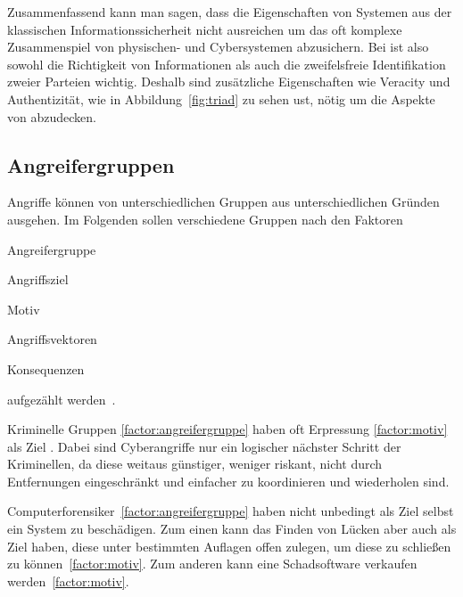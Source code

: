 Zusammenfassend kann man sagen, dass die Eigenschaften von Systemen aus der klassischen Informationssicherheit nicht ausreichen um das oft komplexe Zusammenspiel von physischen- und Cybersystemen abzusichern.
Bei \cps ist also sowohl die Richtigkeit von Informationen als auch die zweifelsfreie Identifikation zweier Parteien wichtig.
Deshalb sind zusätzliche Eigenschaften wie Veracity und Authentizität, wie in Abbildung~\ref{fig:triad} zu sehen ust, nötig um die Aspekte von \cps abzudecken.


\subsection{Angreifergruppen}\label{subsec:angreifergruppen}

Angriffe können von unterschiedlichen Gruppen aus unterschiedlichen Gründen ausgehen.
Im Folgenden sollen verschiedene Gruppen nach den Faktoren
\begin{enumerate*}[label=(\alph*),before=\unskip{: }, itemjoin={{; }}, itemjoin*={{, und }}]
    \item Angreifergruppe\label{factor:angreifergruppe}
    \item Angriffsziel\label{factor:target}
    \item Motiv\label{factor:motiv}
    \item Angriffsvektoren\label{factor:methode}
    \item Konsequenzen\label{factor:konsequenz}
\end{enumerate*} aufgezählt werden~\cite{HLL+17}.

Kriminelle Gruppen \ref{factor:angreifergruppe} haben oft Erpressung \ref{factor:motiv} als Ziel \cite{WYX+10}.
Dabei sind Cyberangriffe nur ein logischer nächster Schritt der Kriminellen, da diese weitaus günstiger, weniger riskant, nicht durch Entfernungen eingeschränkt und einfacher zu koordinieren und wiederholen sind. \cite{CAS+09}

Computerforensiker~\ref{factor:angreifergruppe} haben nicht unbedingt als Ziel selbst ein System zu beschädigen.
Zum einen kann das Finden von Lücken aber auch als Ziel haben, diese unter bestimmten Auflagen offen zulegen, um diese zu schließen zu können~\ref{factor:motiv}. 
Zum anderen kann eine Schadsoftware verkaufen werden~\ref{factor:motiv}. 

